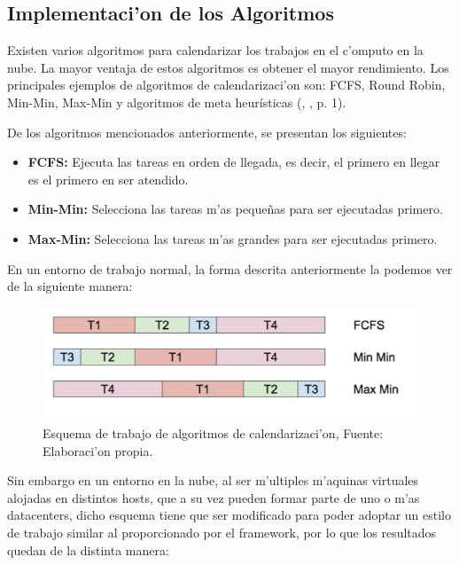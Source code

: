 \subsection{Implementaci'on de los Algoritmos}

Existen varios algoritmos para calendarizar los trabajos en el c'omputo en la nube. La mayor ventaja de estos algoritmos es obtener el mayor rendimiento. Los principales ejemplos de algoritmos de calendarizaci'on son: FCFS, Round Robin, Min-Min, Max-Min y algoritmos de meta heurísticas  (\citeauthor{shimpy2014different}, \citeyear{shimpy2014different}, p. 1).



De los algoritmos mencionados anteriormente, se presentan los siguientes:


\begin{itemize}
	\item  \textbf{FCFS:} Ejecuta las tareas en orden de llegada, es decir, el primero en llegar es el primero en ser atendido.
	\item  \textbf{Min-Min:} Selecciona las tareas m'as pequeñas para ser ejecutadas primero.
	\item  \textbf{Max-Min:} Selecciona las tareas m'as grandes para ser ejecutadas primero.
\end{itemize}

En un entorno de trabajo normal, la forma descrita anteriormente la podemos ver de la siguiente manera:

\begin{figure}
	\caption{Esquema de trabajo de algoritmos de calendarizaci'on, Fuente: Elaboraci'on propia.}
	\centering
	\includegraphics[scale=0.5]{media/imagendos}
\end{figure}


\newpage
Sin embargo en un entorno en la nube, al ser m'ultiples m'aquinas virtuales alojadas en distintos hosts, que a su vez pueden formar parte de uno o m'as datacenters, dicho esquema tiene que ser modificado para poder adoptar un estilo de trabajo similar al proporcionado por el framework, por lo que los resultados quedan de la distinta manera:

